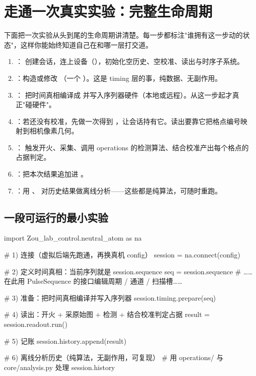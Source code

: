 \documentclass[11pt,oneside,openany]{book}
\begin{document}
\section{走通一次真实实验：完整生命周期}

下面把一次实验从头到尾的生命周期讲清楚。每一步都标注"谁拥有这一步动的状态"，这样你能始终知道自己在和哪一层打交道。

\begin{enumerate}
\item {}： 创建会话，连上设备（），初始化空历史、空校准、读出与时序子系统。
\item {}：构造或修改 （一个 ）。这是 timing 层的事，纯数据、无副作用。
\item {}： 把时间真相编译成  并写入序列器硬件（本地或远程）。从这一步起才真正"碰硬件"。
\item {}：若还没有校准，先做一次得到 ，让会话持有它。读出要靠它把格点编号映射到相机像素几何。
\item {}： 触发开火、采集、调用 operations 的检测算法、结合校准产出每个格点的占据判定。
\item {}：把本次结果追加进 。
\item {}：用 、 对历史结果做离线分析——这些都是纯算法，可随时重跑。
\end{enumerate}

\subsection{一段可运行的最小实验}

\begin{codeblock}[Python]
import Zou_lab_control.neutral_atom as na

# 1) 连接（虚拟后端先跑通，再换真机 config）
session = na.connect(config)

# 2) 定义时间真相：当前序列就是 session.sequence
seq = session.sequence
# ……在此用 PulseSequence 的接口编辑周期 / 通道 / 扫描槽……

# 3) 准备：把时间真相编译并写入序列器
session.timing.prepare(seq)

# 4) 读出：开火 + 采原始图 + 检测 + 结合校准判定占据
result = session.readout.run()

# 5) 记账
session.history.append(result)

# 6) 离线分析历史（纯算法，无副作用，可复现）
#    用 operations/ 与 core/analysis.py 处理 session.history
\end{codeblock}
\end{document}
